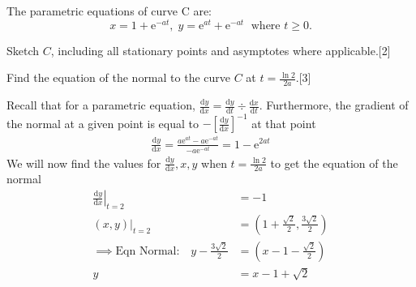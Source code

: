 \documentclass[12pt, a4 paper]{article}
\begin{document}
\begin{outline}[enumerate]
 \1 The parametric equations of curve C are: \[x = 1 + {\mathrm{e}^{ - at}},\;y = {\mathrm{e}^{at}} + {\mathrm{e}^{ - at}}\;{\textrm{ where }}t \geq 0.\] %

 \2  Sketch $C$, including all stationary points and asymptotes where applicable.\hfill[2]
 \begin{answer}
  \color{black}

 \end{answer}

 \2 Find the equation of the normal to the curve $C$ at $t = \frac{\ln{2}}{{2a}}$.\hfill[3]
 \begin{answer}
  Recall that for a parametric equation, $\frac{\mathrm{d}y}{\mathrm{d}x}=\frac{\mathrm{d}y}{\mathrm{d}t}\div\frac{\mathrm{d}x}{\mathrm{d}t}$. Furthermore, the gradient of the normal at a given point is equal to $-[\frac{\mathrm{d}y}{\mathrm{d}x}]^{-1}$ at that point
  \begin{align*}
   \frac{\mathrm{d}y}{\mathrm{d}x}=\frac{a\mathrm{e}^{at}-a\mathrm{e}^{-at}}{-a\mathrm{e}^{-at}} = 1-\mathrm{e}^{2at}
  \end{align*}
  We will now find the values for $\frac{\mathrm{d}y}{\mathrm{d}x}, x, y$ when $t=\frac{\ln2}{2a}$ to get the equation of the normal
  \begin{align*}
   \left.\frac{\mathrm{d}y}{\mathrm{d}x}\right|_{t=2}     & = -1                                      \\
   (x,y)|_{t=2}                                           & = (1+\frac{\sqrt2}{2}, \frac{3\sqrt2}{2}) \\
   \implies \textrm{Eqn Normal:}\quad y-\frac{3\sqrt2}{2} & = (x-1-\frac{\sqrt2}{2})                  \\
   y                                                      & = x-1+\sqrt2
  \end{align*}
 \end{answer}


\end{outline}
\end{document}
